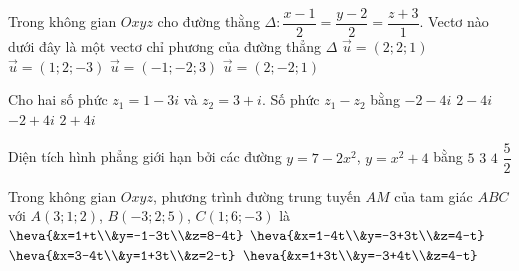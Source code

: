 \begin{ex}%
Trong không gian $Oxyz$ cho đường thằng $\Delta: \dfrac{x-1}{2}=\dfrac{y-2}{2}=\dfrac{z+3}{1}$. Vectơ nào dưới đây là một vectơ chỉ phương của đường thẳng $\Delta$
\choice
{\True $\overrightarrow{u}=\left( 2;2;1\right) $}
{$\overrightarrow{u}=\left( 1;2;-3\right) $}
{$\overrightarrow{u}=\left( -1;-2;3\right) $}
{$\overrightarrow{u}=\left( 2;-2;1 \right) $}
\end{ex}

\begin{ex}%
Cho hai số phức $z_1=1-3i$ và $z_2=3+i$. Số phức $z_1-z_2$ bằng
\choice
{\True $-2-4i$}
{$2-4i$}
{$-2+4i$}
{$2+4i$}
\end{ex}

\begin{ex}%
Diện tích hình phẳng giới hạn bởi các đường $ y=7-2x^2$, $ y=x^2+4$ bằng
\choice
{$5$}
{$3$}
{\True $4$}
{$\dfrac{5}{2}$}
\end{ex}

\begin{ex}%
Trong không gian $Oxyz$, phương trình đường trung tuyến $AM$ của tam giác $ABC$ với $A(3;1;2)$, $B(-3;2;5)$, $C(1;6;-3)$ là
\choice
{$\heva{&x=1+t\\&y=-1-3t\\&z=8-4t}$}
{$\heva{&x=1-4t\\&y=-3+3t\\&z=4-t}$}
{\True $\heva{&x=3-4t\\&y=1+3t\\&z=2-t}$}
{$\heva{&x=1+3t\\&y=-3+4t\\&z=4-t}$}
\end{ex}

